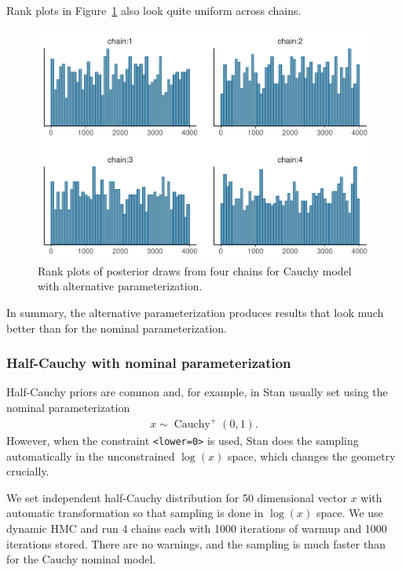 \documentclass[american,]{article}
\DeclareMathOperator{\Cauchy}{Cauchy}
\begin{document}
%
Rank plots in Figure~\ref{fig:hist-fit-alt1-1} also look quite uniform across chains.
\begin{figure}[tp]
  \centering
  \includegraphics[width=0.6\linewidth]{graphics/hist-fit-alt1-1.pdf}
  \caption{Rank plots of posterior draws from four chains for Cauchy model with alternative parameterization.}
  \label{fig:hist-fit-alt1-1}
\end{figure}

In summary, the alternative parameterization produces results that look
much better than for the nominal parameterization.

\hypertarget{half-cauchy-with-nominal-parameterization}{%
\subsubsection{Half-Cauchy with nominal
parameterization}\label{half-cauchy-with-nominal-parameterization}}

Half-Cauchy priors are common and, for example, in Stan usually set
using the nominal parameterization
\begin{align}
  x \sim \Cauchy^+(0,1).
\end{align}
However, when the constraint \texttt{\textless{}lower=0\textgreater{}}
is used, Stan does the sampling automatically in the unconstrained
\(\log(x)\) space, which changes the geometry crucially.

We set independent half-Cauchy distribution for 50 dimensional vector
$x$ with automatic transformation so that sampling is done in
\(\log(x)\) space.  We use dynamic HMC and run 4 chains each with 1000
iterations of warmup and 1000 iterations stored.  There are no
warnings, and the sampling is much faster than for the Cauchy nominal
model.



\end{document}
